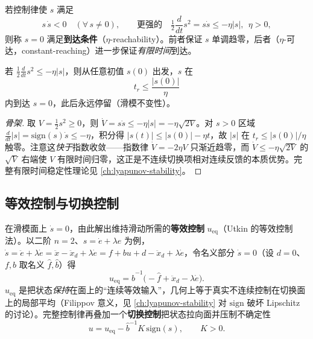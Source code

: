 \begin{definition}[到达条件]
\label{def:smc-reaching}
若控制律使 $s$ 满足
\begin{equation}
  s\,\dot s<0\quad(\forall\, s\neq0),\qquad\text{更强的}\quad \tfrac12\frac{d}{dt}s^2=s\dot s\le-\eta|s|,\ \ \eta>0,
  \label{eq:smc-reaching}
\end{equation}
则称 $s=0$ 满足\textbf{到达条件}（$\eta$-reachability）。前者保证 $s$ 单调趋零，后者（$\eta$-可达，constant-reaching）进一步保证\emph{有限时间}到达。
\end{definition}

\begin{theorem}[有限时间到达]
\label{thm:smc-finite-reach}
若 $\tfrac12\frac{d}{dt}s^2\le-\eta|s|$，则从任意初值 $s(0)$ 出发，$s$ 在
\begin{equation}
  t_r\le \frac{|s(0)|}{\eta}
  \label{eq:smc-treach}
\end{equation}
内到达 $s=0$，此后永远停留（滑模不变性）。
\end{theorem}
\begin{proof}[骨架]
取 $V=\tfrac12 s^2\ge0$，则 $\dot V=s\dot s\le-\eta|s|=-\eta\sqrt{2V}$。对 $s>0$ 区域 $\frac{d}{dt}|s|=\mathrm{sign}(s)\dot s\le-\eta$，积分得 $|s(t)|\le|s(0)|-\eta t$，故 $|s|$ 在 $t_r\le|s(0)|/\eta$ 触零。注意这\emph{快于}指数收敛——指数律 $\dot V=-2\eta V$ 只渐近趋零，而 $\dot V\le-\eta\sqrt{2V}$ 的 $\sqrt{V}$ 右端使 $V$ 有限时间归零，这正是不连续切换项相对连续反馈的本质优势。完整有限时间稳定性理论见 \cref{ch:lyapunov-stability}。
\end{proof}

\subsection{等效控制与切换控制}
在滑模面上 $\dot s=0$，由此解出维持滑动所需的\textbf{等效控制} $u_{\mathrm{eq}}$（Utkin 的等效控制法）。以二阶 $n=2$、$s=\dot e+\lambda e$ 为例，$\dot s=\ddot e+\lambda\dot e=\ddot x-\ddot x_d+\lambda\dot e=f+bu+d-\ddot x_d+\lambda\dot e$，令名义部分 $\dot s=0$（设 $d=0$、$f,b$ 取名义 $\hat f,\hat b$）得
\begin{equation}
  u_{\mathrm{eq}}=\hat b^{-1}\big(-\hat f+\ddot x_d-\lambda\dot e\big).
  \label{eq:smc-ueq}
\end{equation}
$u_{\mathrm{eq}}$ 是把状态\emph{保持}在面上的“连续等效输入”，几何上等于真实不连续控制在切换面上的局部平均（Filippov 意义，见 \cref{ch:lyapunov-stability} 对 $\mathrm{sign}$ 破坏 Lipschitz 的讨论）。完整控制律再叠加一个\textbf{切换控制}把状态拉向面并压制不确定性
\begin{equation}
  u=u_{\mathrm{eq}}-\hat b^{-1}K\,\mathrm{sign}(s),\qquad K>0.
  \label{eq:smc-law}
\end{equation}

